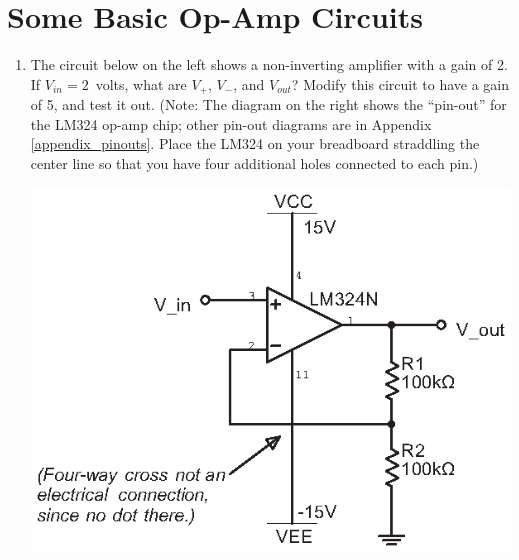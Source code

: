 \section{Some Basic Op-Amp Circuits}
\label{lab_op-amps}


\bigskip

\begin{enumerate}[wide]

\item The circuit below on the left shows a non-inverting amplifier with a gain of 2.  If $V_{in} = 2$~volts, what are $V_+$, $V_-$, and $V_{out}$?  Modify this circuit to have a gain of 5, and test it out. (Note: The diagram on the right shows the ``pin-out'' for the LM324 op-amp chip; other pin-out diagrams are in Appendix \ref{appendix_pinouts}.  Place the LM324 on your breadboard straddling the center line so that you have four additional holes connected to each pin.)
\begin{center}
\includegraphics{op-amps/noninverting.eps}
\hspace{0.2in}

\end{center}
\end{enumerate}
